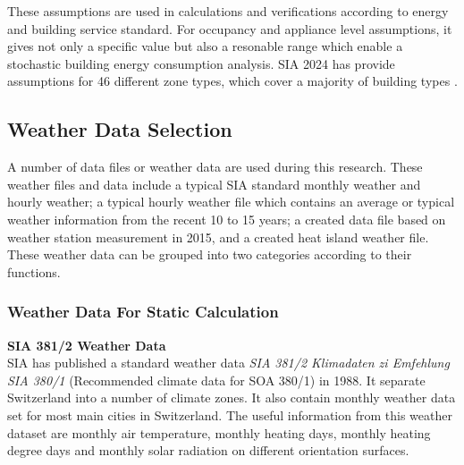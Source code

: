 \documentclass[11pt, a4paper]{article}
\theoremstyle{definition}
\begin{document}
			These assumptions are used in calculations and verifications according to energy and building service standard. For occupancy and appliance level assumptions, it gives not only a specific value but also a resonable range which enable a stochastic building energy consumption analysis. SIA 2024 has provide assumptions for 46 different zone types, which cover a majority of building types \cite{SIA2024Shop}.




	


	\newpage

		\subsection{Weather Data Selection}
			A number of data files or weather data are used during this research. These weather files and data include a typical SIA standard monthly weather and hourly weather; a typical hourly weather file which contains an average or typical weather information from the recent 10 to 15 years; a created data file based on weather station measurement in 2015, and a created heat island weather file. These weather data can be grouped into two categories according to their functions.

			\subsubsection{Weather Data For Static Calculation}
			\textbf{SIA 381/2 Weather Data}\\
				SIA has published a standard weather data \textit{SIA 381/2 Klimadaten zi Emfehlung SIA 380/1} (Recommended climate data for SOA 380/1) in 1988. It separate Switzerland into a number of climate zones. It also contain monthly weather data set for most main cities in Switzerland. The useful information from this weather dataset are monthly air temperature, monthly heating days, monthly heating degree days and monthly solar radiation on different orientation surfaces.\\
\end{document}
